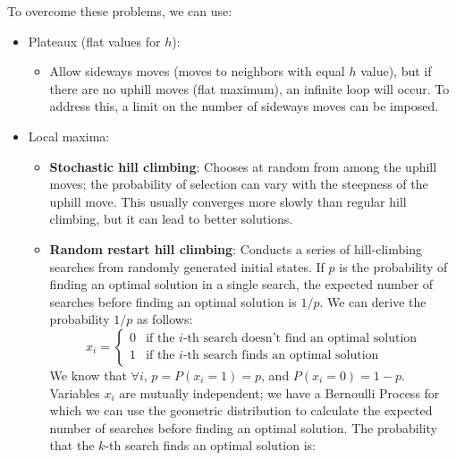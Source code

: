 \documentclass[12pt]{article}
\begin{document}
\begin{enumerate}[label=\textbf{II.\arabic*}]
          To overcome these problems, we can use:
          \begin{itemize}
              \item Plateaux (flat values for \(h\)):
                    \begin{itemize}
                        \item Allow sideways moves (moves to neighbors with equal \(h\) value), but if there are no uphill moves (flat maximum), an infinite loop will occur. To address this, a limit on the number of sideways moves can be imposed.
                    \end{itemize}
              \item Local maxima:
                    \begin{itemize}
                        \item \textbf{Stochastic hill climbing}: Chooses at random from among the uphill moves; the probability of selection can vary with the steepness of the uphill move. This usually converges more slowly than regular hill climbing, but it can lead to better solutions.
                        \item \textbf{Random restart hill climbing}: Conducts a series of hill-climbing searches from randomly generated initial states. If \(p\) is the probability of finding an optimal solution in a single search, the expected number of searches before finding an optimal solution is \(1/p\). We can derive the probability \(1/p\) as follows:
                              \begin{equation}
                                  x_i =
                                  \begin{cases}
                                      0 & \text{if the \(i\)-th search doesn't find an optimal solution} \\
                                      1 & \text{if the \(i\)-th search finds an optimal solution}
                                  \end{cases}
                              \end{equation}
                              We know that \(\forall i\), \(p = P(x_i = 1) = p\), and \(P(x_i = 0) = 1 - p\). Variables \(x_i\) are mutually independent; we have a Bernoulli Process for which we can use the geometric distribution to calculate the expected number of searches before finding an optimal solution. The probability that the \(k\)-th search finds an optimal solution is:
                              \begin{equation}

\end{equation}
\end{itemize}
\end{itemize}
\end{enumerate}
\end{document}

